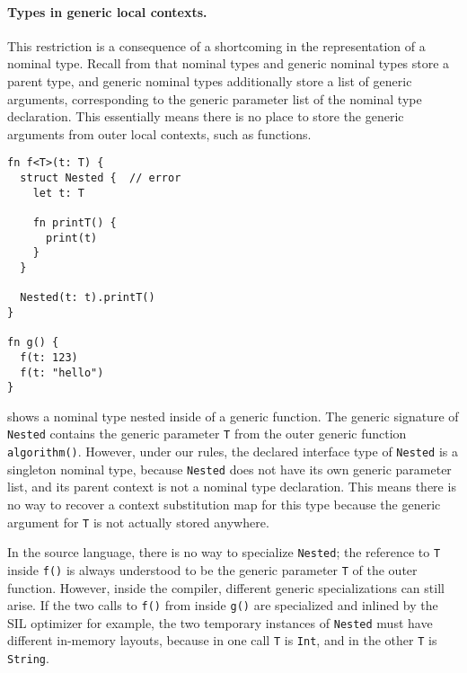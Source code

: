\documentclass[../generics]{subfiles}
\begin{document}
\paragraph{Types in generic local contexts.} This restriction is a consequence of a shortcoming in the representation of a nominal type. Recall from  that nominal types and generic nominal types store a parent type, and generic nominal types additionally store a list of generic arguments, corresponding to the generic parameter list of the nominal type declaration. This essentially means there is no place to store the generic arguments from outer local contexts, such as functions.

\begin{listing}\label{nominal type in generic local context}
\begin{Verbatim}
fn f<T>(t: T) {
  struct Nested {  // error
    let t: T

    fn printT() {
      print(t)
    }
  }
  
  Nested(t: t).printT()
}

fn g() {
  f(t: 123)
  f(t: "hello")
}
\end{Verbatim}
\end{listing}

 shows a nominal type nested inside of a generic function. The generic signature of \texttt{Nested} contains the generic parameter \texttt{T} from the outer generic function \texttt{algorithm()}. However, under our rules, the declared interface type of \texttt{Nested} is a singleton nominal type, because \texttt{Nested} does not have its own generic parameter list, and its parent context is not a nominal type declaration. This means there is no way to recover a context substitution map for this type because the generic argument for \texttt{T} is not actually stored anywhere.

In the source language, there is no way to specialize \texttt{Nested}; the reference to \texttt{T} inside \texttt{f()} is always understood to be the generic parameter \texttt{T} of the outer function. However, inside the compiler, different generic specializations can still arise. If the two calls to \texttt{f()} from inside \texttt{g()} are specialized and inlined by the SIL optimizer for example, the two temporary instances of \texttt{Nested} must have different in-memory layouts, because in one call \texttt{T} is \texttt{Int}, and in the other \texttt{T} is \texttt{String}.
\end{document}
